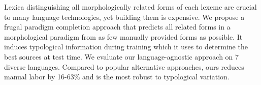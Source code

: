 Lexica distinguishing all morphologically related forms of each lexeme are crucial to many language technologies, yet building them is expensive. We propose a frugal paradigm completion approach that predicts all related forms in a morphological paradigm from as few manually provided forms as possible. It induces typological information during training which it uses to determine the best sources at test time. We evaluate our language-agnostic approach on 7 diverse languages. Compared to popular alternative approaches, ours reduces manual labor by 16-63\% and is the most robust to typological variation.
